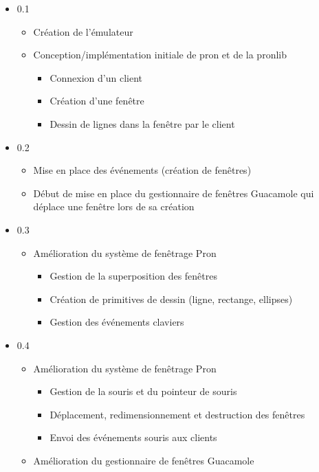 \begin{itemize}
  \item 0.1
    \begin{itemize}
      \item Création de l'émulateur
      \item Conception/implémentation initiale de pron et de la pronlib
        \begin{itemize}
          \item Connexion d'un client
          \item Création d'une fenêtre
          \item Dessin de lignes dans la fenêtre par le client
        \end{itemize}
  \end{itemize}
  \item 0.2
    \begin{itemize}
      \item Mise en place des événements (création de fenêtres)
      \item Début de mise en place du gestionnaire de fenêtres Guacamole qui déplace une fenêtre lors de sa création
  \end{itemize}
  \item 0.3
    \begin{itemize}
      \item Amélioration du système de fenêtrage Pron
        \begin{itemize}
          \item Gestion de la superposition des fenêtres
          \item Création de primitives de dessin (ligne, rectange, ellipses)
          \item Gestion des événements claviers
      \end{itemize}
  \end{itemize}
  \item 0.4
    \begin{itemize}
      \item Amélioration du système de fenêtrage Pron
        \begin{itemize}
          \item Gestion de la souris et du pointeur de souris
          \item Déplacement, redimensionnement et destruction des fenêtres
          \item Envoi des événements souris aux clients
      \end{itemize}
      \item Amélioration du gestionnaire de fenêtres Guacamole

\end{itemize}
\end{itemize}

